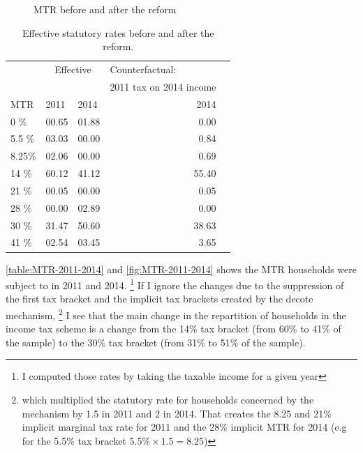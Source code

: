 \begin{figure}[H]
    \caption{MTR before and after the reform}
    \label{fig:MTR-2011-2014}
\end{figure}




		\begin{table}[H]
    \caption{Effective statutory rates before and after the reform.}
    \label{table:MTR-2011-2014}
    \center
    \begin{tabular}{@{}lllrr@{}}
    \toprule
& \multicolumn{2}{c}{Effective} & \multicolumn{1}{l}{Counterfactual:}\\
&               &               & 2011 tax on 2014 income\\
\cmidrule(lr){2-3} \cmidrule(lr){4-4}
MTR      & 2011   &  2014 & 2014 \\ 
\midrule      
0	  \%  & 00.65  &	01.88 &  0.00     \\
5.5 \%	& 03.03  &	00.00 &  0.84     \\
8.25\%	& 02.06  &	00.00 &  0.69     \\
14	\%  & 60.12  &	41.12 &  55.40     \\
21	\%  & 00.05  &	00.00 &  0.05     \\
28	\%  & 00.00  &	02.89 &  0.00     \\
30	\%  & 31.47  &	50.60 &  38.63     \\
41	\%  & 02.54  &	03.45 &  3.65     \\
\bottomrule
    \end{tabular}
    \end{table}
\autoref{table:MTR-2011-2014} and \autoref{fig:MTR-2011-2014} shows the MTR households were subject to in 2011 and 2014.
\footnote{I computed those rates by taking the taxable income for a given year }
If I ignore the changes due to the suppression of the first tax bracket and the implicit tax brackets created by the decote mechanism,
\footnote{which multiplied the statutory rate for households concerned by the mechanism by 1.5 in 2011 and 2 in 2014. That creates the 8.25 and 21\% implicit marginal tax rate for 2011 and the 28\% implicit MTR for 2014 (e.g  for the 5.5\% tax bracket $5.5\% \times 1.5 = 8.25$) } 
I see that the main change in the repartition of households in the income tax scheme is a change from the 14\% tax bracket (from 60\% to 41\% of the sample) to the 30\% tax bracket (from 31\% to 51\% of the sample). 

